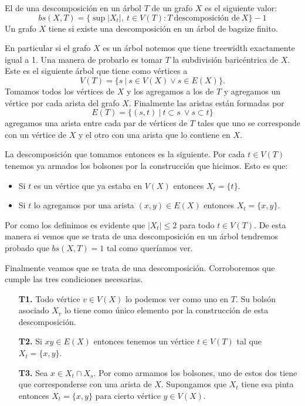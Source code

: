 \documentclass[tesis.tex]{subfiles}
\begin{document}
\begin{deff}
El  de una descomposición en un árbol $T$ de un grafo $X$ es el siguiente valor:
	\begin{equation*}
		bs(X,T) = \{ \sup |X_t|, \ t \in V(T) : T \ \text{descomposición de} \ X  \} - 1
	\end{equation*}
Un grafo $X$ tiene  si existe una descomposición en un árbol de bagsize finito.	
\end{deff}
\begin{ej}\label{desc-arbol-arbol}
 En particular si el grafo $X$ es un árbol notemos que tiene treewidth exactamente igual a 1.
 Una manera de probarlo es tomar $T$ la subdivisión baricéntrica de $X$. 
 Este es el siguiente árbol que tiene como vértices a 
 \[
 V(T) = \{ s \ | \ s \in V(X)  \lor s \in E(X) \}.
 \]
 Tomamos todos los vértices de $X$ y los agregamos a los de $T$ y agregamos un vértice por cada arista del grafo $X$.
 Finalmente las aristas están formadas por 
 \[
 E(T) = \{  (s,t) \ | \ t \subset s \ \lor s \subset t \}
 \]
 agregamos una arista entre cada par de vértices de $T$ tales que uno se corresponde con un vértice de $X$ y el otro con una arista que lo contiene en $X$. 
 
 
 La descomposición que tomamos entonces es la siguiente. 
 Por cada $t \in V(T)$ tenemos ya armados los bolsones por la construcción que hicimos. 
 Esto es que:
 \begin{itemize}
 	\item Si $t$ es un vértice que ya estaba en $V(X)$ entonces $X_t = \{ t \}$. 
 	\item Si $t$ lo agregamos por una arista $(x,y) \in E(X)$ entonces $X_t = \{ x,y  \}$.
 \end{itemize}
Por como los definimos es evidente que $|X_t| \le 2$ para todo $t \in V(T)$.
De esta manera si vemos que se trata de una descomposición en un árbol tendremos probado que $bs(X,T) = 1$ tal como queríamos ver.

Finalmente veamos que se trata de una descomposición. Corroboremos que cumple las tres condiciones necesarias.
\begin{enumerate}
	\item[\textbf{T1.}] Todo vértice $v \in V(X)$ lo podemos ver como uno en $T$. Su bolsón asociado $X_v$ lo tiene como único elemento por la construcción de esta descomposición.
	\item[\textbf{T2.}] Si $xy \in E(X)$ entonces tenemos un vértice $t\in V(T)$ tal que $X_{t} = \{ x,y \}$. 
	\item[\textbf{T3.}] Sea $x \in X_t \cap X_s$. 
	Por como armamos los bolsones, uno de estos dos tiene que corresponderse con una arista de $X$.
	Supongamos que $X_t$ tiene esa pinta entonces $X_t = \{ x,y\}$ para cierto vértice $y \in V(X)$.
	

\end{enumerate}
\end{ej}
\end{document}
